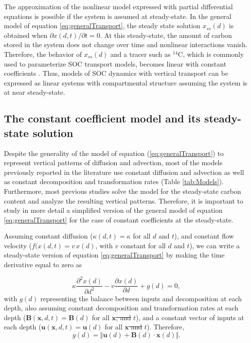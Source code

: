 \documentclass[11pt, oneside, a4paper]{article}   	%
\providecommand{\DIFdeltex}[1]{{\protect\color{red}\sout{#1}}}                      %
\providecommand{\DIFdelbegin}{} %
\providecommand{\DIFdelend}{} %
\providecommand{\DIFdel}[1]{\texorpdfstring{\DIFdeltex{#1}}{}} %
\newcommand{\DIFscaledelfig}{0.5}
\newlength{\DIFdelgraphicswidth} %
\newlength{\DIFdelgraphicsheight} %
\newcommand{\DIFdelincludegraphics}[2][]{%
\sbox{\DIFdelgraphicsbox}{\DIFOincludegraphics[#1]{#2}}%
\settoboxwidth{\DIFdelgraphicswidth}{\DIFdelgraphicsbox} %
\settoboxtotalheight{\DIFdelgraphicsheight}{\DIFdelgraphicsbox} %
\scalebox{\DIFscaledelfig}{%
\parbox[b]{\DIFdelgraphicswidth}{\usebox{\DIFdelgraphicsbox}\\[-\baselineskip] \rule{\DIFdelgraphicswidth}{0em}}\llap{\resizebox{\DIFdelgraphicswidth}{\DIFdelgraphicsheight}{%
\setlength{\unitlength}{\DIFdelgraphicswidth}%
\begin{picture}(1,1)%
\thicklines\linethickness{2pt} %
{\color[rgb]{1,0,0}\put(0,0){\framebox(1,1){}}}%
{\color[rgb]{1,0,0}\put(0,0){\line( 1,1){1}}}%
{\color[rgb]{1,0,0}\put(0,1){\line(1,-1){1}}}%
\end{picture}%
}\hspace*{3pt}}} %
} %
\DeclareRobustCommand{\DIFdelbegin}{\DIFOdelbegin \let\includegraphics\DIFdelincludegraphics} %
\DeclareRobustCommand{\DIFdelend}{\DIFOaddend \let\includegraphics\DIFOincludegraphics} %
\begin{document}
The approximation of the nonlinear model expressed with partial differential equations is possible if the system is assumed at steady-state. In the general model of equation \ref{eq:generalTransport}, the steady state solution $x_{ss}(d)$ is obtained when $\partial x(d, t)/\partial t =0 $. At this steady-state, the amount of carbon stored in the system does not change over time and nonlinear interactions vanish. Therefore, the behavior of $x_{ss}(d)$ and a tracer such as $^{14}$C, which is commonly used to parameterize SOC transport models, becomes linear with constant coefficients \citep{Anderson1983}. 
Thus, models of SOC dynamics with vertical transport can be expressed as linear systems with compartmental structure assuming the system is at near steady-state. 

\subsection{The constant coefficient model and its steady-state solution}
Despite the generality of the model of equation (\ref{eq:generalTransport}) to represent vertical patterns of diffusion and advection, most of the models previously reported in the literature use constant diffusion and advection as well as  constant decomposition and transformation rates (Table \ref{tab:Models}). Furthermore, most previous studies solve the model for the steady-state carbon content and analyze the resulting vertical patterns. Therefore, it is important to study in more detail a simplified version of the general model of equation \ref{eq:generalTransport} for the case of constant coefficients at the steady-state.

Assuming constant diffusion ($\kappa (d, t) = \kappa$ for all $d$ and $t$), and constant flow velocity ($f(x(d,t) = v \, x(d)$, with $v$ constant for all $d$ and $t$), we can write a steady-state version of equation \ref{eq:generalTransport} by making the time derivative equal to zero as

\begin{equation} \label{eq:linearSecondOrder}
 \kappa \frac{\partial^2 x(d)}{\partial d^2} - v \frac{\partial x(d)}{\partial d} + g(d) =0,
\end{equation}
with $g(d)$ representing the balance between inputs and decomposition at each depth, also assuming constant decomposition and transformation rates at each depth ($\mathbf{B}(\bm{x}, d,t) = \mathbf{B}(d)$ for all  \DIFdelbegin \DIFdel{$\bm{x}$, and }\DIFdelend $t$), and a constant vector of inputs at each depth ($\bm{u}(\bm{x}, d, t) = \bm{u}(d)$ for all \DIFdelbegin \DIFdel{$\bm{x}$ and }\DIFdelend $t$). Therefore, 
\begin{equation}
g(d) = \Vert \bm{u}(d) + \mathbf{B}(d) \cdot \bm{x}(d) \Vert .
\end{equation}
\end{document}
